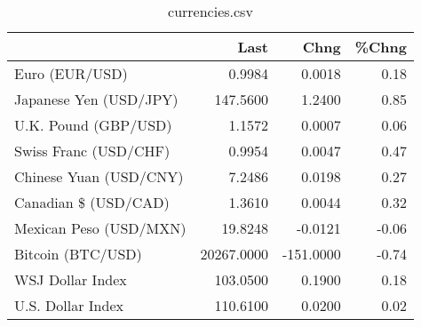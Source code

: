 \documentclass{article}%
\begin{document}
%


\begin{table}[htbp]%
\caption{currencies.csv}%
\centering%
\begin{adjustbox}{width=1\textwidth}%
\begin{tabular}{lrrr}
\toprule
                       &       Last &      Chng &  \%Chng \\
\midrule
        Euro (EUR/USD) &     0.9984 &    0.0018 &   0.18 \\
Japanese Yen (USD/JPY) &   147.5600 &    1.2400 &   0.85 \\
  U.K. Pound (GBP/USD) &     1.1572 &    0.0007 &   0.06 \\
 Swiss Franc (USD/CHF) &     0.9954 &    0.0047 &   0.47 \\
Chinese Yuan (USD/CNY) &     7.2486 &    0.0198 &   0.27 \\
  Canadian \$ (USD/CAD) &     1.3610 &    0.0044 &   0.32 \\
Mexican Peso (USD/MXN) &    19.8248 &   -0.0121 &  -0.06 \\
     Bitcoin (BTC/USD) & 20267.0000 & -151.0000 &  -0.74 \\
      WSJ Dollar Index &   103.0500 &    0.1900 &   0.18 \\
     U.S. Dollar Index &   110.6100 &    0.0200 &   0.02 \\
\bottomrule
\end{tabular}
%
\end{adjustbox}%
\end{table}

%
\end{document}
